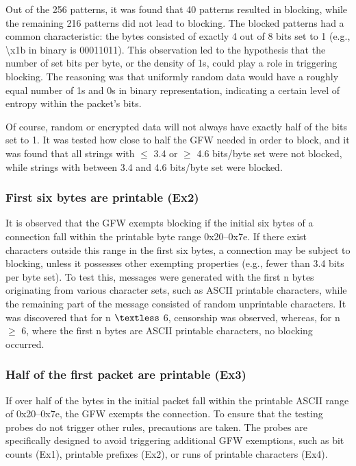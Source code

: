 Out of the 256 patterns, it was found that 40 patterns resulted in blocking, while the remaining 216 patterns did not lead to blocking. The blocked patterns had a common characteristic: the bytes consisted of exactly 4 out of 8 bits set to 1 (e.g., \textbackslash x1b in binary is 00011011). This observation led to the hypothesis that the number of set bits per byte, or the density of 1s, could play a role in triggering blocking. The reasoning was that uniformly random data would have a roughly equal number of 1s and 0s in binary representation, indicating a certain level of entropy within the packet's bits.

Of course, random or encrypted data will not always have exactly half of the bits set to 1. It was tested how close to half the GFW needed in order to block, and it was found that all strings with $\leq$ 3.4 or $\geq$ 4.6 bits/byte set were not blocked, while strings with between 3.4 and 4.6 bits/byte set were blocked.

\subsubsection{\textbf{First six bytes are printable (Ex2)}}
It is observed that the GFW exempts blocking if the initial six bytes of a connection fall within the printable byte range 0x20–0x7e. If there exist characters outside this range in the first six bytes, a connection may be subject to blocking, unless it possesses other exempting properties (e.g., fewer than 3.4 bits per byte set). To test this, messages were generated with the first n bytes originating from various character sets, such as ASCII printable characters, while the remaining part of the message consisted of random unprintable characters. It was discovered that for n $\textless$ 6, censorship was observed, whereas, for n $\geq$ 6, where the first n bytes are ASCII printable characters, no blocking occurred.

\subsubsection{\textbf{Half of the first packet are printable (Ex3)}}
If over half of the bytes in the initial packet fall within the printable ASCII range of 0x20–0x7e, the GFW exempts the connection. To ensure that the testing probes do not trigger other rules, precautions are taken. The probes are specifically designed to avoid triggering additional GFW exemptions, such as bit counts (Ex1), printable prefixes (Ex2), or runs of printable characters (Ex4). 

